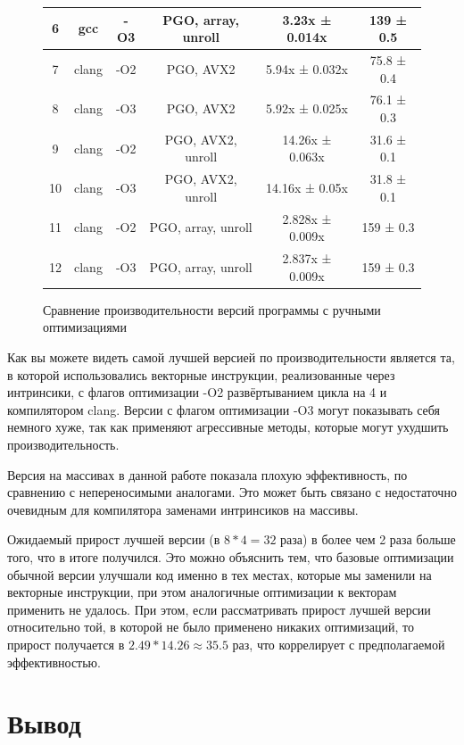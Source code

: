 \documentclass[12pt,a4paper]{article}
\begin{document}
\begin{figure}[ht!]
\begin{tabular}{|c|c|c|c|c|c|}
        \hline
        6 & gcc & -O3 & PGO, array, unroll & 3.23x ± 0.014x & 139 ± 0.5  \\
        \hline
        7 & clang & -O2 & PGO, AVX2 & 5.94x ± 0.032x & 75.8 ± 0.4  \\
        \hline
        8 & clang & -O3 & PGO, AVX2 & 5.92x ± 0.025x & 76.1 ± 0.3  \\
        \hline
        9 & clang & -O2 & PGO, AVX2, unroll & 14.26x ± 0.063x & 31.6 ± 0.1  \\
        \hline
        10 & clang & -O3 & PGO, AVX2, unroll & 14.16x ± 0.05x & 31.8 ± 0.1  \\
        \hline
        11 & clang & -O2 & PGO, array, unroll & 2.828x ± 0.009x & 159 ± 0.3  \\
        \hline
        12 & clang & -O3 & PGO, array, unroll & 2.837x ± 0.009x & 159 ± 0.3 \\
        \bottomrule
    \end{tabular}
    \caption{Сравнение производительности версий программы с ручными оптимизациями}
    \label{fig:histogram1}
\end{figure}

Как вы можете видеть самой лучшей версией по производительности является та, в которой использовались векторные инструкции, реализованные через интринсики, с флагов оптимизации -O2 развёртыванием цикла на 4 и компилятором clang. Версии с флагом оптимизации -O3 могут показывать себя немного хуже, так как применяют агрессивные методы, которые могут ухудшить производительность.

Версия на массивах в данной работе показала плохую эффективность, по сравнению с непереносимыми аналогами. Это может быть связано с недостаточно очевидным для компилятора заменами интринсиков на массивы.

Ожидаемый прирост лучшей версии (в $8*4=32$ раза) в более чем 2 раза  больше того, что в итоге получился. Это можно объяснить тем, что базовые оптимизации обычной версии улучшали код именно в тех местах, которые мы заменили на векторные инструкции, при этом аналогичные оптимизации к векторам применить не удалось. При этом, если рассматривать прирост лучшей версии относительно той, в которой не было применено никаких оптимизаций, то прирост получается в $2.49*14.26\approx35.5$ раз, что коррелирует с предполагаемой эффективностью.

\section{Вывод}
\end{document}

